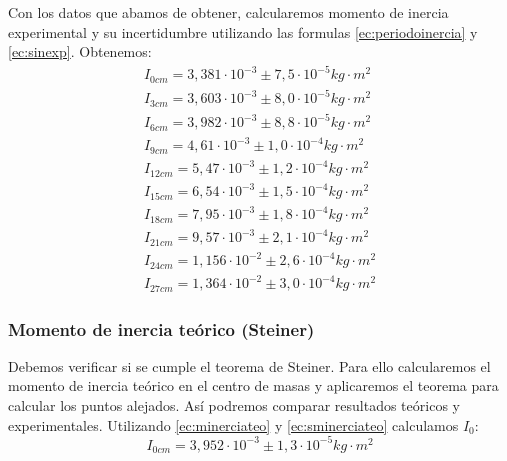 \documentclass[12pt, a4paper, titlepage]{article}
\begin{document}
  Con los datos que abamos de obtener, calcularemos momento de inercia experimental y su incertidumbre utilizando las formulas \ref{ec:periodoinercia} y \ref{ec:sinexp}. Obtenemos:
  \begin{gather*}
    I_{0cm} = 3,381 \cdot 10^{-3} \pm 7,5 \cdot 10^{-5} kg \cdot m^2 \\
    I_{3cm} = 3,603 \cdot 10^{-3} \pm 8,0 \cdot 10^{-5} kg \cdot m^2 \\
    I_{6cm} = 3,982 \cdot 10^{-3} \pm 8,8 \cdot 10^{-5} kg \cdot m^2 \\
    I_{9cm} = 4,61 \cdot 10^{-3} \pm 1,0 \cdot 10^{-4} kg \cdot m^2 \\
    I_{12cm} = 5,47 \cdot 10^{-3} \pm 1,2 \cdot 10^{-4} kg \cdot m^2 \\
    I_{15cm} = 6,54 \cdot 10^{-3} \pm 1,5 \cdot 10^{-4} kg \cdot m^2 \\
    I_{18cm} = 7,95 \cdot 10^{-3} \pm 1,8 \cdot 10^{-4} kg \cdot m^2 \\
    I_{21cm} = 9,57 \cdot 10^{-3} \pm 2,1 \cdot 10^{-4} kg \cdot m^2 \\
    I_{24cm} = 1,156 \cdot 10^{-2} \pm 2,6 \cdot 10^{-4} kg \cdot m^2 \\
    I_{27cm} = 1,364 \cdot 10^{-2} \pm 3,0 \cdot 10^{-4} kg \cdot m^2
  \end{gather*}

  \newpage
  \subsubsection{Momento de inercia teórico (Steiner)}

  Debemos verificar si se cumple el teorema de Steiner. Para ello calcularemos el momento de inercia teórico en el centro de masas y aplicaremos el teorema para calcular los puntos alejados. Así podremos comparar resultados teóricos y experimentales. Utilizando \ref{ec:minerciateo} y \ref{ec:sminerciateo} calculamos $I_0$:
  \begin{equation*}
    I_{0cm} = 3,952 \cdot 10^{-3} \pm 1,3 \cdot 10^{-5} kg \cdot m^2
  \end{equation*}
\end{document}
